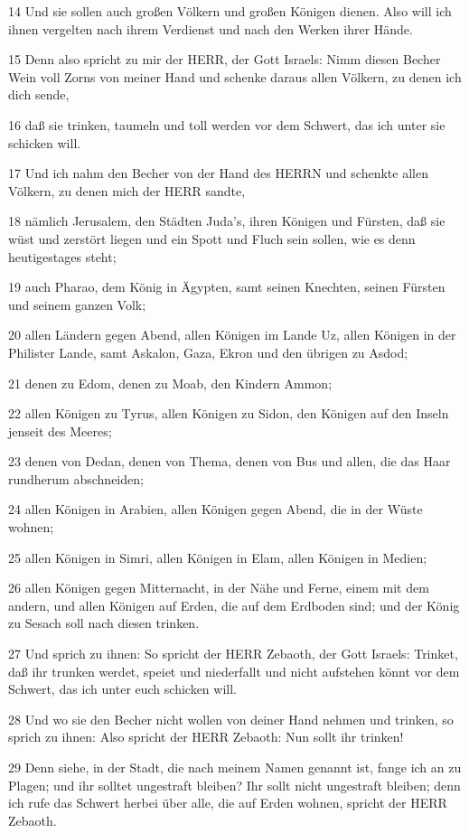 \par 14 Und sie sollen auch großen Völkern und großen Königen dienen. Also will ich ihnen vergelten nach ihrem Verdienst und nach den Werken ihrer Hände.
\par 15 Denn also spricht zu mir der HERR, der Gott Israels: Nimm diesen Becher Wein voll Zorns von meiner Hand und schenke daraus allen Völkern, zu denen ich dich sende,
\par 16 daß sie trinken, taumeln und toll werden vor dem Schwert, das ich unter sie schicken will.
\par 17 Und ich nahm den Becher von der Hand des HERRN und schenkte allen Völkern, zu denen mich der HERR sandte,
\par 18 nämlich Jerusalem, den Städten Juda's, ihren Königen und Fürsten, daß sie wüst und zerstört liegen und ein Spott und Fluch sein sollen, wie es denn heutigestages steht;
\par 19 auch Pharao, dem König in Ägypten, samt seinen Knechten, seinen Fürsten und seinem ganzen Volk;
\par 20 allen Ländern gegen Abend, allen Königen im Lande Uz, allen Königen in der Philister Lande, samt Askalon, Gaza, Ekron und den übrigen zu Asdod;
\par 21 denen zu Edom, denen zu Moab, den Kindern Ammon;
\par 22 allen Königen zu Tyrus, allen Königen zu Sidon, den Königen auf den Inseln jenseit des Meeres;
\par 23 denen von Dedan, denen von Thema, denen von Bus und allen, die das Haar rundherum abschneiden;
\par 24 allen Königen in Arabien, allen Königen gegen Abend, die in der Wüste wohnen;
\par 25 allen Königen in Simri, allen Königen in Elam, allen Königen in Medien;
\par 26 allen Königen gegen Mitternacht, in der Nähe und Ferne, einem mit dem andern, und allen Königen auf Erden, die auf dem Erdboden sind; und der König zu Sesach soll nach diesen trinken.
\par 27 Und sprich zu ihnen: So spricht der HERR Zebaoth, der Gott Israels: Trinket, daß ihr trunken werdet, speiet und niederfallt und nicht aufstehen könnt vor dem Schwert, das ich unter euch schicken will.
\par 28 Und wo sie den Becher nicht wollen von deiner Hand nehmen und trinken, so sprich zu ihnen: Also spricht der HERR Zebaoth: Nun sollt ihr trinken!
\par 29 Denn siehe, in der Stadt, die nach meinem Namen genannt ist, fange ich an zu Plagen; und ihr solltet ungestraft bleiben? Ihr sollt nicht ungestraft bleiben; denn ich rufe das Schwert herbei über alle, die auf Erden wohnen, spricht der HERR Zebaoth.
